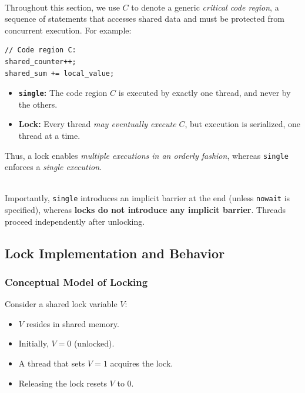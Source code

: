 \begin{ppnote}
\\Throughout this section, we use $C$ to denote a generic \emph{critical code region}, a sequence of statements that accesses shared data and must be protected from concurrent execution. For example:
\begin{lstlisting}[language=C11]
// Code region C:
shared_counter++;
shared_sum += local_value;
\end{lstlisting}
\end{ppnote}

\begin{ppkey}
\begin{itemize}
    \item \textbf{\texttt{single}:} The code region $C$ is executed by exactly one thread, and never by the others.
    \item \textbf{Lock:} Every thread \emph{may eventually execute} $C$, but execution is serialized, one thread at a time.
\end{itemize}
Thus, a lock enables \emph{multiple executions in an orderly fashion}, whereas \texttt{single} enforces a \emph{single execution}.
\end{ppkey}

\begin{ppnote}
\\ Importantly, \texttt{single} introduces an implicit barrier at the end (unless \texttt{nowait} is specified), whereas \textbf{locks do not introduce any implicit barrier}. Threads proceed independently after unlocking.
\end{ppnote}

\subsection{Lock Implementation and Behavior}

\subsubsection{Conceptual Model of Locking}

Consider a shared lock variable $V$:
\begin{itemize}
    \item $V$ resides in shared memory.
    \item Initially, $V = 0$ (unlocked).
    \item A thread that sets $V = 1$ acquires the lock.
    \item Releasing the lock resets $V$ to $0$.
\end{itemize}

